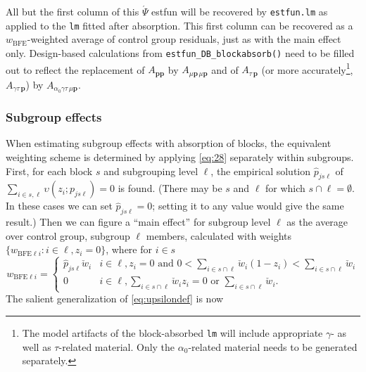 \documentclass{article}
\newcommand{\owt}[1][{[z_{i}]}]{\ensuremath{\check{w}_{i#1}}}
\newcommand{\absorbInterceptsEF}{\upsilon}
\begin{document}
All but the first column of this $\acute{\Psi}$ estfun will be
recovered by \texttt{estfun.lm} as applied to the \texttt{lm} fitted
after absorption.  This first column can be recovered as a
$w_{\text{BFE}}$-weighted average of control group residuals, just as
with the main effect only. Design-based calculations from
\texttt{estfun\_DB\_blockabsorb()} need to be filled out to reflect
the replacement of $A_{\mathbf{p}\mathbf{p}}$ by $A_{\mu \mathbf{p}\,
  \mu\mathbf{p}}$ and of $A_{\tau\,\mathbf{p}}$ (or more accurately\footnote{%
The model artifacts of the block-absorbed \texttt{lm} will include
appropriate $\gamma$- as well as $\tau$-related
material. Only the $\alpha_{0}$-related material needs to be generated
separately.
}, $A_{\gamma\tau\,\mathbf{p}}$) by $A_{\alpha_{0}\gamma \tau\, \mu\mathbf{p}}$.

\subsubsection{Subgroup effects}
When estimating subgroup effects with absorption of blocks,
the equivalent weighting scheme is determined by applying
\eqref{eq:28} separately within subgroups.  First, for each block $s$
and subgrouping level $\ell$, the empirical solution
$\hat{p}_{js\ell}$  of $\sum_{i \in s, \ell}
\absorbInterceptsEF (z_{i}; p_{js\ell})=0$ is found.
(There may be $s$ and $\ell$ for which $s \cap \ell = \emptyset$. In
these cases we can set $\hat{p}_{js\ell}=0$; setting it to any value
would give the same result.)  Then we can figure a ``main effect'' for
subgroup level $\ell$ as the average over control group, subgroup
$\ell$ members, calculated with weights $\{w_{\text{BFE} \ell i}: i
\in \ell, z_{i}=0\}$, where for $i \in s$ 
\begin{equation*}
  w_{\text{BFE} \ell i} =
  \begin{cases}
    \hat{p}_{js\ell} \owt[] & i \in \ell, z_i =0 \text{ and } 0 < \sum_{i
  \in s\cap \ell} \owt[] (1-z_{i})< \sum_{i \in s\cap \ell} \owt[]\\
0 &  i \in \ell, \sum_{i \in s\cap \ell} \owt[] z_{i} = 0 \text{ or }
  \sum_{i \in s\cap \ell} \owt[].
  \end{cases}
\end{equation*}
The salient generalization of \eqref{eq:upsilondef} is now
\end{document}
